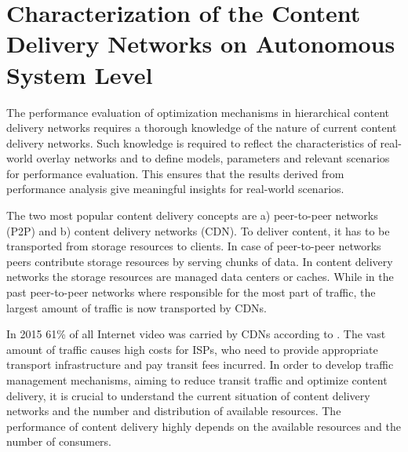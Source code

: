 \chapter{Characterization of the Content Delivery Networks on Autonomous System Level}\label{chap:aslevel}

The performance evaluation of optimization mechanisms in hierarchical content delivery networks requires a thorough knowledge of the nature of current content delivery networks.
Such knowledge is required to reflect the characteristics of real-world overlay networks and to define models, parameters and relevant scenarios for performance evaluation.
This ensures that the results derived from performance analysis give meaningful insights for real-world scenarios.

The two most popular content delivery concepts are a) peer-to-peer networks (P2P) and b) content delivery networks (CDN).
To deliver content, it has to be transported from storage resources to clients.
In case of peer-to-peer networks peers contribute storage resources by serving chunks of data.
In content delivery networks the storage resources are managed data centers or caches.
While in the past peer-to-peer networks where responsible for the most part of traffic, the largest amount of traffic is now transported by CDNs.

In 2015 61\% of all Internet video was carried by CDNs according to \cite{cisco2015}.
The vast amount of traffic causes high costs for ISPs, who need to provide appropriate transport infrastructure and pay transit fees incurred.
In order to develop traffic management mechanisms, aiming to reduce transit traffic and optimize content delivery, it is crucial to understand the current situation of content delivery networks and the number and distribution of available resources.
The performance of content delivery highly depends on the available resources and the number of consumers.


